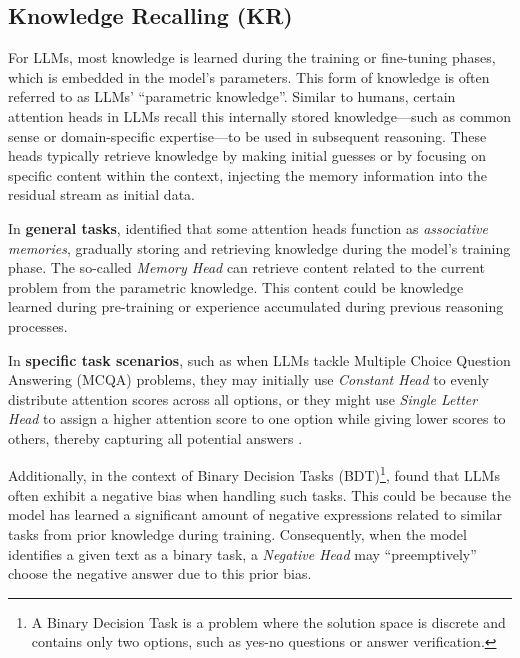 \documentclass{article}
\begin{document}


\subsection{Knowledge Recalling (KR)} \label{subsec:KR}
For LLMs, most knowledge is learned during the training or fine-tuning phases, which is embedded in the model's parameters. This form of knowledge is often referred to as LLMs' ``parametric knowledge''. Similar to humans, certain attention heads in LLMs recall this internally stored knowledge—such as common sense or domain-specific expertise—to be used in subsequent reasoning. These heads typically retrieve knowledge by making initial guesses or by focusing on specific content within the context, injecting the memory information into the residual stream as initial data.

In \textbf{general tasks}, \citet{AssociativeMemory_23_NIPS_Meta} identified that some attention heads function as \textit{associative memories}, gradually storing and retrieving knowledge during the model's training phase. The so-called \textit{Memory Head} \citep{KnowledgeConflict_24_arXiv_UCAS} can retrieve content related to the current problem from the parametric knowledge. This content could be knowledge learned during pre-training or experience accumulated during previous reasoning processes.

In \textbf{specific task scenarios}, such as when LLMs tackle Multiple Choice Question Answering (MCQA) problems, they may initially use \textit{Constant Head} to evenly distribute attention scores across all options, or they might use \textit{Single Letter Head} to assign a higher attention score to one option while giving lower scores to others, thereby capturing all potential answers \citep{CorrectLetterHead_23_arXiv_DeepMind}.

Additionally, in the context of Binary Decision Tasks (BDT)\footnote{A Binary Decision Task is a problem where the solution space is discrete and contains only two options, such as yes-no questions or answer verification.}, \citet{NegativeHead_24_arXiv_SNU} found that LLMs often exhibit a negative bias when handling such tasks. This could be because the model has learned a significant amount of negative expressions related to similar tasks from prior knowledge during training. Consequently, when the model identifies a given text as a binary task, a \textit{Negative Head} may ``preemptively'' choose the negative answer due to this prior bias.
\end{document}
